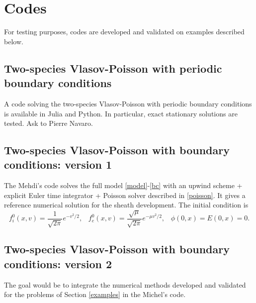 \documentclass[12pt,english]{article}
\theoremstyle{plain}\newtheorem{theorem}{Theorem}[section]
\theoremstyle{plain}\newtheorem{corollary}{Corollary}[section]
\theoremstyle{plain}\newtheorem{lemma}{Lemma}[section]
\begin{document}
\section{Codes} 
For testing purposes, codes are developed and validated on examples described below. 

\subsection{Two-species Vlasov-Poisson with periodic boundary conditions}  
A code solving the two-species Vlasov-Poisson with periodic boundary conditions is available in Julia and Python. 
In particular, exact stationary solutions are tested. Ask to Pierre Navaro. 

\subsection{Two-species Vlasov-Poisson with boundary conditions: version 1}
The Mehdi's code solves the full model \eqref{model}-\eqref{bc} with an upwind scheme + explicit Euler time integrator + 
Poisson solver described in \ref{poisson}. It gives a reference numerical solution for the sheath development. 
The initial condition is 
$$
f_i^0(x, v) = \frac{1}{\sqrt{2\pi}} e^{-v^2/2}, \;\;\; f_e^0(x, v) = \frac{\sqrt{\mu}}{\sqrt{2\pi}} e^{-\mu v^2/2}, \;\;\; \phi(0, x)=E(0, x)=0. 
$$

\subsection{Two-species Vlasov-Poisson with boundary conditions: version 2}
The goal would be to integrate the numerical methods developed and validated for the problems of Section \ref{examples} 
in the Michel's code.  

\end{document}
